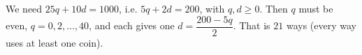 We need $25q+10d=1000$, i.e. $5q+2d=200$, with $q,d\ge0$. Then $q$ must be even, $q=0,2,\dots,40$, and each gives one $d=\dfrac{200-5q}{2}$. That is $\boxed{21}$ ways (every way uses at least one coin).
